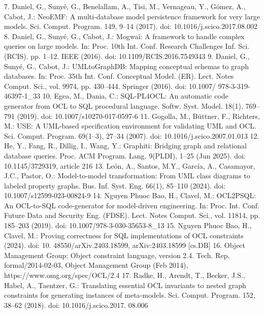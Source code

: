 7. Daniel, G., Sunyé, G., Benelallam, A., Tisi, M., Vernageau, Y., Gómez, A., Cabot, J.: NeoEMF: A multi-database model
persistence framework for very large models. Sci. Comput. Program. 149, 9–14 (2017). doi: 10.1016/j.scico.2017.08.002
8. Daniel, G., Sunyé, G., Cabot, J.: Mogwaï: A framework to handle complex queries on large models. In: Proc. 10th Int.
Conf. Research Challenges Inf. Sci. (RCIS). pp. 1–12. IEEE (2016). doi: 10.1109/RCIS.2016.7549343
9. Daniel, G., Sunyé, G., Cabot, J.: UMLtoGraphDB: Mapping conceptual schemas to graph databases. In: Proc. 35th
Int. Conf. Conceptual Model. (ER). Lect. Notes Comput. Sci., vol. 9974, pp. 430–444. Springer (2016). doi: 10.1007/
978-3-319-46397-1_33
10. Egea, M., Dania, C.: SQL-PL4OCL: An automatic code generator from OCL to SQL procedural language. Softw. Syst.
Model. 18(1), 769–791 (2019). doi: 10.1007/s10270-017-0597-6
11. Gogolla, M., Büttner, F., Richters, M.: USE: A UML-based specification environment for validating UML and OCL.
Sci. Comput. Program. 69(1–3), 27–34 (2007). doi: 10.1016/j.scico.2007.01.013
12. He, Y., Fang, R., Dillig, I., Wang, Y.: Graphiti: Bridging graph and relational database queries. Proc. ACM Program.
Lang. 9(PLDI), 1–25 (Jun 2025). doi: 10.1145/3729319, article 216
13. León, A., Santos, M.Y., García, A., Casamayor, J.C., Pastor, O.: Model-to-model transformation: From UML class diagrams to labeled property graphs. Bus. Inf. Syst. Eng. 66(1), 85–110 (2024). doi: 10.1007/s12599-023-00824-9
14. Nguyen Phuoc Bao, H., Clavel, M.: OCL2PSQL: An OCL-to-SQL code-generator for model-driven engineering. In:
Proc. Int. Conf. Future Data and Security Eng. (FDSE). Lect. Notes Comput. Sci., vol. 11814, pp. 185–203 (2019).
doi: 10.1007/978-3-030-35653-8_13
15. Nguyen Phuoc Bao, H., Clavel, M.: Proving correctness for SQL implementations of OCL constraints (2024). doi: 10.
48550/arXiv.2403.18599, arXiv:2403.18599 [cs.DB]
16. Object Management Group: Object constraint language, version 2.4. Tech. Rep. formal/2014-02-03, Object Management
Group (Feb 2014), https://www.omg.org/spec/OCL/2.4
17. Radke, H., Arendt, T., Becker, J.S., Habel, A., Taentzer, G.: Translating essential OCL invariants to nested graph constraints for generating instances of meta-models. Sci. Comput. Program. 152, 38–62 (2018). doi: 10.1016/j.scico.2017.
08.006